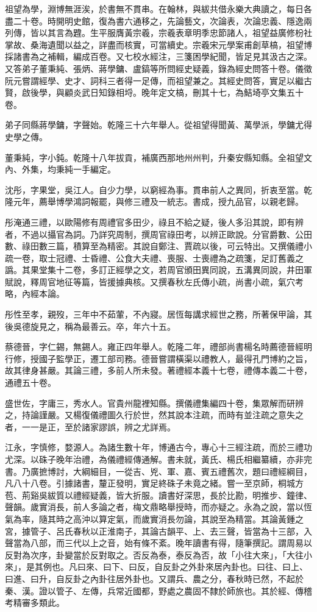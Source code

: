 \begin{pinyinscope}
祖望為學，淵博無涯涘，於書無不貫串。在翰林，與紱共借永樂大典讀之，每日各盡二十卷。時開明史館，復為書六通移之，先論藝文，次論表，次論忠義、隱逸兩列傳，皆以其言為韙。生平服膺黃宗羲，宗羲表章明季忠節諸人，祖望益廣修枌社掌故、桑海遺聞以益之，詳盡而核實，可當續史。宗羲宋元學案甫創草槁，祖望博採諸書為之補輯，編成百卷。又七校水經注，三箋困學紀聞，皆足見其汲古之深。又答弟子董秉純、張炳、蔣學鏞、盧鎬等所問經史疑義，錄為經史問答十卷。儀徵阮元嘗謂經學、史才、詞科三者得一足傳，而祖望兼之。其經史問答，實足以繼古賢，啟後學，與顧炎武日知錄相埒。晚年定文槁，刪其十七，為鮚埼亭文集五十卷。

弟子同縣蔣學鏞，字聲始。乾隆三十六年舉人。從祖望得聞黃、萬學派，學鏞尤得史學之傳。

董秉純，字小鈍。乾隆十八年拔貢，補廣西那地州州判，升秦安縣知縣。全祖望文內、外集，均秉純一手編定。

沈彤，字果堂，吳江人。自少力學，以窮經為事。貫串前人之異同，折衷至當。乾隆元年，薦舉博學鴻詞報罷，與修三禮及一統志。書成，授九品官，以親老歸。

彤淹通三禮，以歐陽修有周禮官多田少，祿且不給之疑，後人多沿其說，即有辨者，不過以攝官為詞。乃詳究周制，撰周官祿田考，以辨正歐說。分官爵數、公田數、祿田數三篇，積算至為精密。其說自鄭注、賈疏以後，可云特出。又撰儀禮小疏一卷，取士冠禮、士昏禮、公食大夫禮、喪服、士喪禮為之疏箋，足訂舊義之譌。其果堂集十二卷，多訂正經學之文，若周官頒田異同說，五溝異同說，井田軍賦說，釋周官地征等篇，皆援據典核。又撰春秋左氏傳小疏，尚書小疏，氣穴考略，內經本論。

彤性至孝，親歿，三年中不茹葷，不內寢。居恆每講求經世之務，所著保甲論，其後吳德旋見之，稱為最善云。卒，年六十五。

蔡德晉，字仁錫，無錫人。雍正四年舉人。乾隆二年，禮部尚書楊名時薦德晉經明行修，授國子監學正，遷工部司務。德晉嘗謂橫渠以禮教人，最得孔門博約之旨，故其律身甚嚴。其論三禮，多前人所未發。著禮經本義十七卷，禮傳本義二十卷，通禮五十卷。

盛世佐，字庸三，秀水人。官貴州龍裡知縣。撰儀禮集編四十卷，集眾解而研辨之，持論謹嚴。又楊復儀禮圖久行於世，然其說本注疏，而時有並注疏之意失之者，一一是正，至於諸家謬誤，辨之尤詳焉。

江永，字慎修，婺源人。為諸生數十年，博通古今，專心十三經注疏，而於三禮功尤深。以硃子晚年治禮，為儀禮經傳通解。書未就，黃氏、楊氏相繼纂續，亦非完書。乃廣摭博討，大綱細目，一從吉、兇、軍、嘉、賓五禮舊次，題曰禮經綱目，凡八十八卷。引據諸書，釐正發明，實足終硃子未竟之緒。嘗一至京師，桐城方苞、荊谿吳紱質以禮經疑義，皆大折服。讀書好深思，長於比勘，明推步、鐘律、聲韻。歲實消長，前人多論之者，梅文鼎略舉授時，而亦疑之。永為之說，當以恆氣為率，隨其時之高沖以算定氣，而歲實消長勿論，其說至為精當。其論黃鍾之宮，據管子、呂氏春秋以正淮南子，其論古韻平、上、去三聲，皆當為十三部，入聲當為八部，而三代以上之音，始有條不紊。晚年讀書有得，隨筆撰記。謂周易以反對為次序，卦變當於反對取之。否反為泰，泰反為否，故「小往大來」，「大往小來」，是其例也。凡曰來、曰下、曰反，自反卦之外卦來居內卦也。曰往、曰上、曰進、曰升，自反卦之內卦往居外卦也。又謂兵、農之分，春秋時已然，不起於秦、漢。證以管子、左傳，兵常近國都，野處之農固不隸於師旅也。其於經、傳稽考精審多類此。


\end{pinyinscope}

